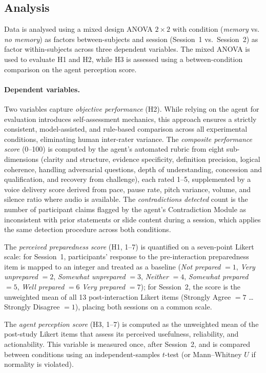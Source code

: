 \subsection{Analysis}
Data is analysed using a mixed design ANOVA $2 \times 2$ with condition (\textit{memory} vs. \textit{no memory}) as factors between-subjects and session (Session~1 vs.\ Session~2) as factor within-subjects across three dependent variables. The mixed ANOVA is used to evaluate H1 and H2, while H3 is assessed using a between-condition comparison on the agent perception score.

\paragraph{Dependent variables.}
Two variables capture \textit{objective performance} (H2). While relying on the agent for evaluation introduces self-assessment mechanics, this approach ensures a strictly consistent, model-assisted, and rule-based comparison across all experimental conditions, eliminating human inter-rater variance. The \textit{composite performance score} (0--100) is computed by the agent's automated rubric from eight sub-dimensions (clarity and structure, evidence specificity, definition precision, logical coherence, handling adversarial questions, depth of understanding, concession and qualification, and recovery from challenge), each rated 1--5, supplemented by a voice delivery score derived from pace, pause rate, pitch variance, volume, and silence ratio where audio is available. The \textit{contradictions detected} count is the number of participant claims flagged by the agent's Contradiction Module as inconsistent with prior statements or slide content during a session, which applies the same detection procedure across both conditions.

The \textit{perceived preparedness score} (H1, 1--7) is quantified on a seven-point Likert scale: for Session~1, participants' response to the pre-interaction preparedness item is mapped to an integer and treated as a baseline (\textit{Not prepared} $= 1$, \textit{Very unprepared} $= 2$, \textit{Somewhat unprepared} $= 3$, \textit{Neither} $= 4$, \textit{Somewhat prepared} $= 5$, \textit{Well prepared} $= 6$ \textit{Very prepared} $= 7$); for Session~2, the score is the unweighted mean of all 13 post-interaction Likert items (Strongly Agree $= 7$ \ldots{} Strongly Disagree $= 1$), placing both sessions on a common scale.

The \textit{agent perception score} (H3, 1--7) is computed as the unweighted mean of the post-study Likert items that assess its perceived usefulness, reliability, and actionability. This variable is measured once, after Session~2, and is compared between conditions using an independent-samples $t$-test (or Mann--Whitney $U$ if normality is violated).

